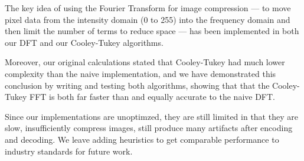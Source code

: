 
The key idea of using the Fourier Transform for image compression --- to move pixel data from the intensity domain (0 to 255) into the frequency domain and then limit the number of terms to reduce space --- has been implemented in both our DFT and our Cooley-Tukey algorithms.

Moreover, our original calculations stated that Cooley-Tukey had much lower complexity than the naive implementation, and we have demonstrated this conclusion by writing and testing both algorithms, showing that that the Cooley-Tukey FFT is both far faster than and equally accurate to the naive DFT.

Since our implementations are unoptimzed, they are still limited in that they are slow, insufficiently compress images, still produce many artifacts after encoding and decoding. We leave adding heuristics to get comparable performance to industry standards for future work.
